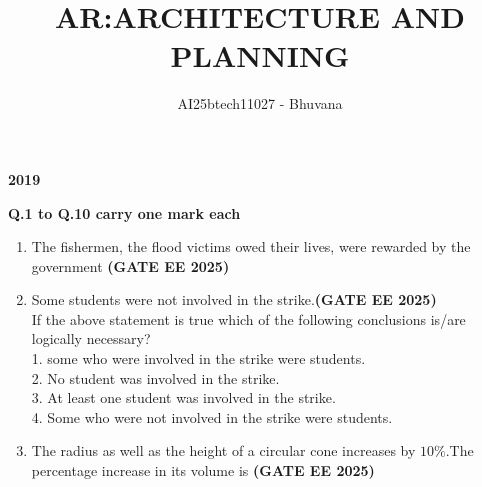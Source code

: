 \documentclass[journal,12pt,onecolumn]{IEEEtran}
\theoremstyle{remark}
\begin{document}
\title{AR:ARCHITECTURE AND PLANNING}
\author{AI25btech11027 - Bhuvana}
\maketitle
\renewcommand{\thefigure}{\theenumi}
\renewcommand{\thetable}{\theenumi}
\begin {center}
\large \textbf{2019}\\
\end{center}
\textbf{Q.1 to Q.10 carry one mark each}
\begin{enumerate}
\item The fishermen, \underline{\makebox[2cm]{\hfill}} the flood victims owed their lives, were rewarded by the government \hfill \textbf{(GATE EE 2025)}
\begin{enumerate}
    \end{enumerate}
\item Some students were not involved in the strike.\hfill \textbf{(GATE EE 2025)}\\
If the above statement is true which of the following conclusions is/are logically necessary?\\
1. some who were involved in the strike were students.\\
2. No student was involved in the strike.\\
3. At least one student was involved in the strike.\\
4. Some who were not involved in the strike were students.\\
\begin{enumerate}
\end{enumerate}
\item The radius as well as the height of a circular cone increases by $10\%$.The percentage increase in its volume is \underline{\makebox[2cm]{\hfill}} \hfill \textbf{(GATE EE 2025)}

\end{enumerate}
\end{document}
